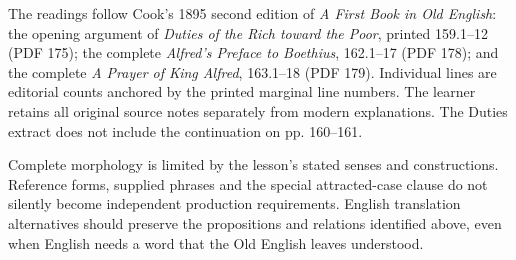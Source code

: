 The readings follow Cook’s 1895 second edition of \emph{A First Book in Old English}: the opening argument of \emph{Duties of the Rich toward the Poor}, printed 159.1–12 (PDF 175); the complete \emph{Alfred’s Preface to Boethius}, 162.1–17 (PDF 178); and the complete \emph{A Prayer of King Alfred}, 163.1–18 (PDF 179). Individual lines are editorial counts anchored by the printed marginal line numbers. The learner retains all original source notes separately from modern explanations. The Duties extract does not include the continuation on pp. 160–161.

Complete morphology is limited by the lesson’s stated senses and constructions. Reference forms, supplied phrases and the special attracted-case clause do not silently become independent production requirements. English translation alternatives should preserve the propositions and relations identified above, even when English needs a word that the Old English leaves understood.


\par\label{end-ch15-key}
\clearpage\endgroup
